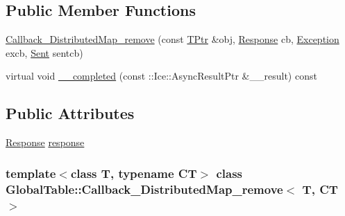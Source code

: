 \subsection*{Public Member Functions}
\begin{DoxyCompactItemize}
\item 
\hyperlink{class_global_table_1_1_callback___distributed_map__remove_a72af11d1b8111f72c12130a587e01072}{Callback\_\-DistributedMap\_\-remove} (const \hyperlink{class_global_table_1_1_callback___distributed_map__remove_a4b1ddb2d17252cf60a112c6f5cf47cba}{TPtr} \&obj, \hyperlink{class_global_table_1_1_callback___distributed_map__remove_a688f2491241f9e271cd69a42337257ee}{Response} cb, \hyperlink{class_global_table_1_1_callback___distributed_map__remove_a41f61bd2c451c6b36b1180b0a728d1a9}{Exception} excb, \hyperlink{class_global_table_1_1_callback___distributed_map__remove_a4f807ae9e10f4f3fe1b7f7f677bb5379}{Sent} sentcb)
\item 
virtual void \hyperlink{class_global_table_1_1_callback___distributed_map__remove_a82443b2a95106769343ee2ea70a94210}{\_\-\_\-completed} (const ::Ice::AsyncResultPtr \&\_\-\_\-result) const 
\end{DoxyCompactItemize}
\subsection*{Public Attributes}
\begin{DoxyCompactItemize}
\item 
\hyperlink{class_global_table_1_1_callback___distributed_map__remove_a688f2491241f9e271cd69a42337257ee}{Response} \hyperlink{class_global_table_1_1_callback___distributed_map__remove_ab200004ef5fb4df6f426fd5bcb418b4b}{response}
\end{DoxyCompactItemize}
\subsubsection*{template$<$class T, typename CT$>$ class GlobalTable::Callback\_\-DistributedMap\_\-remove$<$ T, CT $>$}



